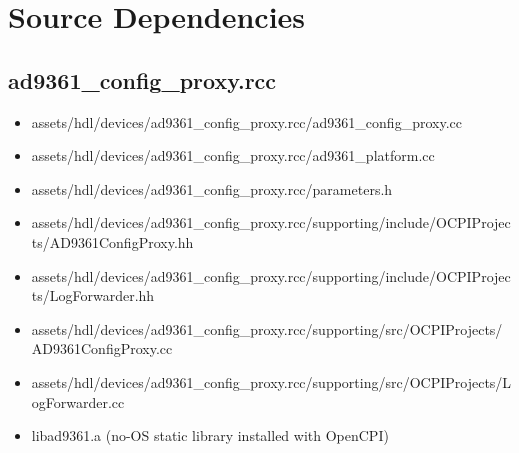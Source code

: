 \documentclass{article}
\def\comp{ad9361\_config\_proxy}
\begin{document}
\section*{Source Dependencies}
\subsection*{\comp.rcc}
\begin{itemize}
	\item assets/hdl/devices/\comp{}.rcc/\comp{}.cc
	\item assets/hdl/devices/\comp{}.rcc/ad9361\_platform.cc
	\item assets/hdl/devices/\comp{}.rcc/parameters.h
	\item assets/hdl/devices/\comp{}.rcc/supporting/include/OCPIProjects/AD9361ConfigProxy.hh
	\item assets/hdl/devices/\comp{}.rcc/supporting/include/OCPIProjects/LogForwarder.hh
	\item assets/hdl/devices/\comp{}.rcc/supporting/src/OCPIProjects/AD9361ConfigProxy.cc
	\item assets/hdl/devices/\comp{}.rcc/supporting/src/OCPIProjects/LogForwarder.cc
	\item libad9361.a (no-OS static library installed with OpenCPI)
\end{itemize}
\end{document}
